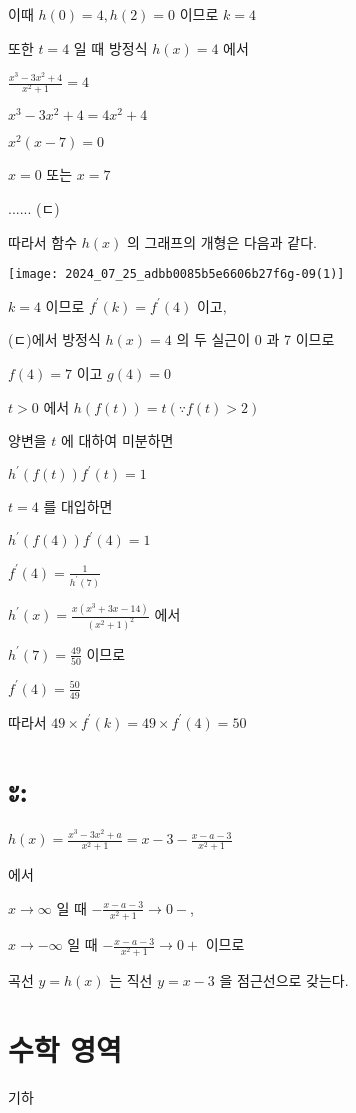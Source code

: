 \documentclass[10pt]{article}
\begin{document}
이때 $h(0)=4, h(2)=0$ 이므로 $k=4$

또한 $t=4$ 일 때 방정식 $h(x)=4$ 에서

$\frac{x^{3}-3 x^{2}+4}{x^{2}+1}=4$

$x^{3}-3 x^{2}+4=4 x^{2}+4$

$x^{2}(x-7)=0$

$x=0$ 또는 $x=7$

...... (ㄷ)

따라서 함수 $h(x)$ 의 그래프의 개형은 다음과 같다.

\begin{center}
\texttt{[image: 2024\_07\_25\_adbb0085b5e6606b27f6g-09(1)]}
\end{center}

$k=4$ 이므로 $f^{\prime}(k)=f^{\prime}(4)$ 이고,

(ㄷ)에서 방정식 $h(x)=4$ 의 두 실근이 0 과 7 이므로

$f(4)=7$ 이고 $g(4)=0$

$t>0$ 에서 $h(f(t))=t(\because f(t)>2)$

양변을 $t$ 에 대하여 미분하면

$h^{\prime}(f(t)) f^{\prime}(t)=1$

$t=4$ 를 대입하면

$h^{\prime}(f(4)) f^{\prime}(4)=1$

$f^{\prime}(4)=\frac{1}{h^{\prime}(7)}$

$h^{\prime}(x)=\frac{x\left(x^{3}+3 x-14\right)}{\left(x^{2}+1\right)^{2}}$ 에서

$h^{\prime}(7)=\frac{49}{50}$ 이므로

$f^{\prime}(4)=\frac{50}{49}$

따라서 $49 \times f^{\prime}(k)=49 \times f^{\prime}(4)=50$

\section*{ะ:}
$h(x)=\frac{x^{3}-3 x^{2}+a}{x^{2}+1}=x-3-\frac{x-a-3}{x^{2}+1}$

에서

$x \rightarrow \infty$ 일 때 $-\frac{x-a-3}{x^{2}+1} \rightarrow 0-$,

$x \rightarrow-\infty$ 일 때 $-\frac{x-a-3}{x^{2}+1} \rightarrow 0+$ 이므로

곡선 $y=h(x)$ 는 직선 $y=x-3$ 을 점근선으로 갖는다.

\section*{수학 영역}
기하
\end{document}
